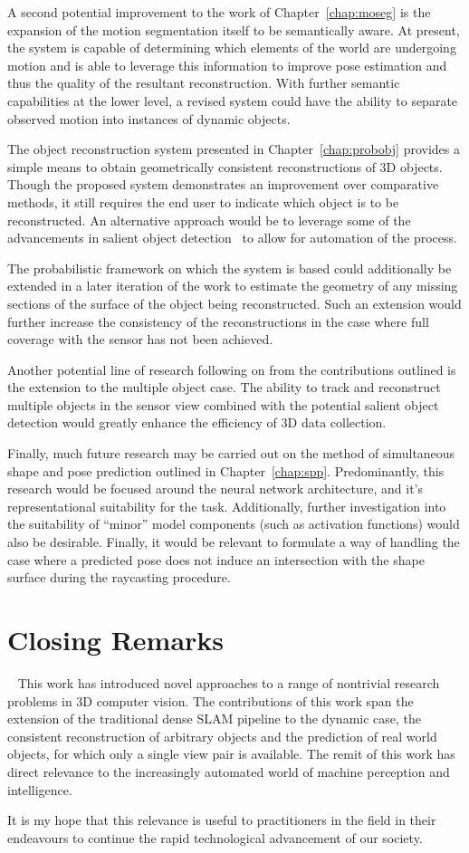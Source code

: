 A second potential improvement to the work of Chapter~\ref{chap:moseg} is the expansion of the 
motion segmentation itself to be semantically aware. At present, the system is capable of 
determining which elements of the world are undergoing motion and is able to leverage this 
information to improve pose estimation and thus the quality of the resultant reconstruction. 
With further semantic capabilities at the lower level, a revised system could have the ability 
to separate observed motion into instances of dynamic objects.

The object reconstruction system presented in Chapter~\ref{chap:probobj} provides a simple means 
to obtain geometrically consistent reconstructions of 3D objects. Though the proposed system
demonstrates an improvement over comparative methods, it still requires the end user to indicate 
which object is to be reconstructed. An alternative approach would be to leverage some of the 
advancements in salient object detection~\cite{Borji2014} to allow for automation of the process.

The probabilistic framework on which the system is based could additionally be extended in a later 
iteration of the work to estimate the geometry of any missing sections of the surface of the object 
being reconstructed. Such an extension would further increase the consistency of the reconstructions 
in the case where full coverage with the sensor has not been achieved.

Another potential line of research following on from the contributions outlined is the extension to 
the multiple object case. The ability to track and reconstruct multiple objects in the sensor view 
combined with the potential salient object detection would greatly enhance the efficiency of 3D data 
collection.

Finally, much future research may be carried out on the method of simultaneous shape and pose prediction 
outlined in Chapter~\ref{chap:spp}. Predominantly, this research would be focused around the neural network 
architecture, and it's representational suitability for the task. Additionally, further investigation into 
the suitability of ``minor'' model components (such as activation functions) would also be desirable. Finally, 
it would be relevant to formulate a way of handling the case where a predicted pose does not induce an intersection 
with the shape surface during the raycasting procedure.

\section{Closing Remarks}
~\label{sec:discussion_conclusions}
This work has introduced novel approaches to a range of nontrivial research problems in 3D computer 
vision. The contributions of this work span the extension of the traditional dense SLAM pipeline to 
the dynamic case, the consistent reconstruction of arbitrary objects and the prediction of real world 
objects, for which only a single view pair is available. The remit of this work has direct relevance to 
the increasingly automated world of machine perception and intelligence.

It is my hope that this relevance is useful to practitioners in the field in their endeavours 
to continue the rapid technological advancement of our society.